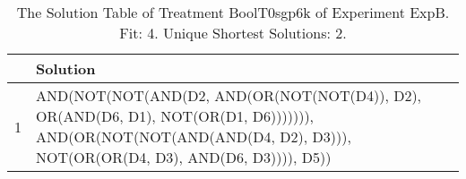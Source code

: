 \begin{table}[ht]
\centering
\begin{tabular}{rp{9cm}}
  \hline
 & Solution \\ 
  \hline
1 & AND(NOT(NOT(AND(D2, AND(OR(NOT(NOT(D4)), D2), OR(AND(D6, D1), NOT(OR(D1, D6))))))), AND(OR(NOT(NOT(AND(AND(D4, D2), D3))), NOT(OR(OR(D4, D3), AND(D6, D3)))), D5)) \\ 
   \hline
\end{tabular}
\caption{The Solution Table of Treatment BoolT0sgp6k of Experiment ExpB. Fit: 4. Unique Shortest Solutions: 2.} 
\end{table}
